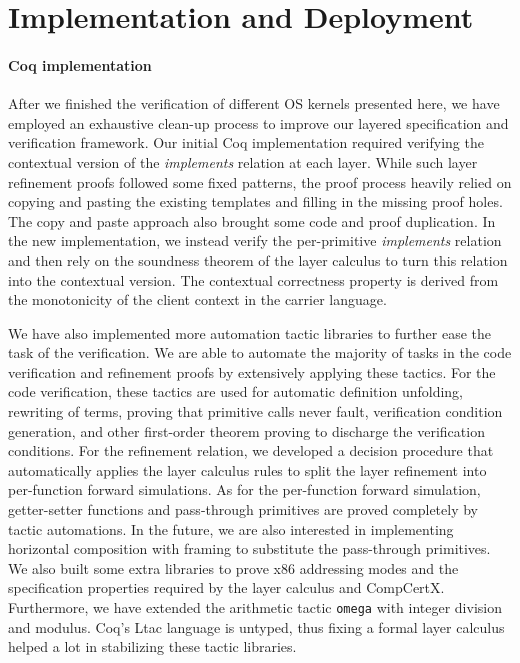 
\section{Implementation and Deployment}
\label{sec:eval:impl}

\paragraph{Coq implementation}

After we finished the verification of different OS kernels presented
here, we have employed an exhaustive clean-up process to improve our
layered specification and verification framework.  Our initial Coq
implementation required verifying the contextual version of the
{\em implements} relation at each layer.  While such layer refinement
proofs followed some fixed patterns, the proof process heavily relied
on copying and pasting the existing templates and filling in the
missing proof holes.  The copy and paste approach also brought some
code and proof duplication.  In the new implementation, we instead
verify the per-primitive {\em implements} relation and then rely on the
soundness theorem of the layer calculus to turn this relation into the
contextual version. The contextual correctness property is derived
from the monotonicity of the client context in the carrier language.

We have also implemented more automation tactic libraries to further
ease the task of the verification. We are able to automate the majority of
tasks in the code verification and refinement proofs by extensively
applying these tactics. For the code verification, these tactics are
used for automatic definition unfolding, rewriting of terms, proving
that primitive calls never fault, verification condition generation,
and other first-order theorem proving to discharge the verification
conditions.  For the refinement relation, we developed a decision
procedure that automatically applies the layer calculus rules to split
the layer refinement into per-function forward simulations.  As for
the per-function forward simulation, getter-setter functions and
pass-through primitives are proved completely by tactic automations.
In the future, we are also interested in implementing horizontal
composition with framing to substitute the pass-through primitives.
We also built some extra libraries to prove x86 addressing modes and
the specification properties required by the layer calculus and
CompCertX.  Furthermore, we have extended the arithmetic
tactic \texttt{omega} with integer division and modulus.  Coq's
Ltac language is untyped, thus fixing a formal layer calculus helped a
lot in stabilizing these tactic libraries.

